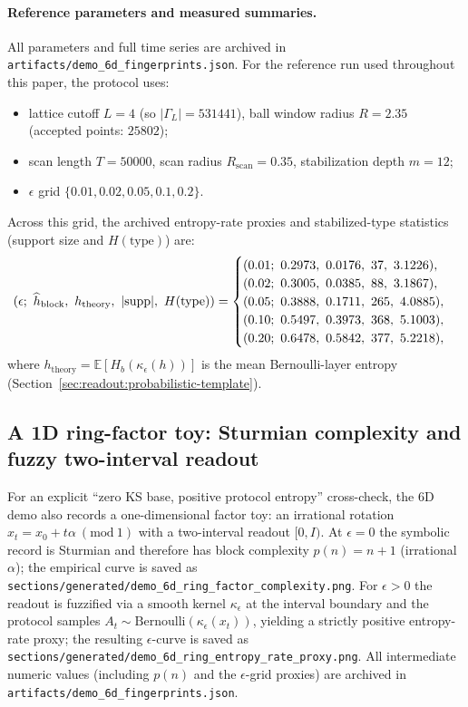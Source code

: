 \paragraph{Reference parameters and measured summaries.}
All parameters and full time series are archived in \texttt{artifacts/demo\_6d\_fingerprints.json}. For the reference run used throughout this paper, the protocol uses:
\begin{itemize}[leftmargin=*,itemsep=2pt]
  \item lattice cutoff $L=4$ (so $|\Gamma_L|=531441$), ball window radius $R=2.35$ (accepted points: $25802$);
  \item scan length $T=50000$, scan radius $R_{\mathrm{scan}}=0.35$, stabilization depth $m=12$;
  \item $\epsilon$ grid $\{0.01,0.02,0.05,0.1,0.2\}$.
\end{itemize}
Across this grid, the archived entropy-rate proxies and stabilized-type statistics (support size and $H(\text{type})$) are:
\[
(\epsilon;\ \widehat h_{\mathrm{block}},\ h_{\mathrm{theory}},\ |{\rm supp}|,\ H(\text{type}))
=
\begin{cases}
(0.01;\ 0.2973,\ 0.0176,\ 37,\ 3.1226),\\
(0.02;\ 0.3005,\ 0.0385,\ 88,\ 3.1867),\\
(0.05;\ 0.3888,\ 0.1711,\ 265,\ 4.0885),\\
(0.10;\ 0.5497,\ 0.3973,\ 368,\ 5.1003),\\
(0.20;\ 0.6478,\ 0.5842,\ 377,\ 5.2218),
\end{cases}
\]
where $h_{\mathrm{theory}}=\mathbb{E}[H_b(\kappa_\epsilon(h))]$ is the mean Bernoulli-layer entropy (Section~\ref{sec:readout:probabilistic-template}).

\subsection{A 1D ring-factor toy: Sturmian complexity and fuzzy two-interval readout}
For an explicit ``zero KS base, positive protocol entropy'' cross-check, the 6D demo also records a one-dimensional factor toy: an irrational rotation $x_t=x_0+t\alpha\ (\mathrm{mod}\ 1)$ with a two-interval readout $[0,I)$.
At $\epsilon=0$ the symbolic record is Sturmian and therefore has block complexity $p(n)=n+1$ (irrational $\alpha$); the empirical curve is saved as \texttt{sections/generated/demo\_6d\_ring\_factor\_complexity.png}.
For $\epsilon>0$ the readout is fuzzified via a smooth kernel $\kappa_\epsilon$ at the interval boundary and the protocol samples $A_t\sim\mathrm{Bernoulli}(\kappa_\epsilon(x_t))$, yielding a strictly positive entropy-rate proxy; the resulting $\epsilon$-curve is saved as \texttt{sections/generated/demo\_6d\_ring\_entropy\_rate\_proxy.png}.
All intermediate numeric values (including $p(n)$ and the $\epsilon$-grid proxies) are archived in \texttt{artifacts/demo\_6d\_fingerprints.json}.


